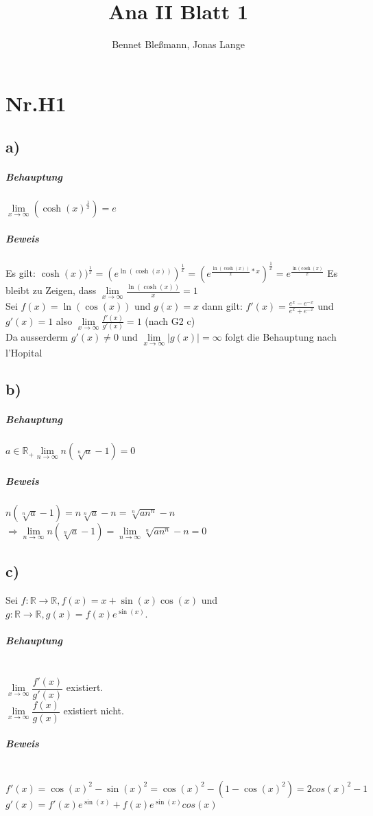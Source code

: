 \documentclass[12pt,a4paper,oneside,ngerman]{article} %
\title{Ana II Blatt 1}
\author{Bennet Bleßmann, Jonas Lange}
\begin{document}
\maketitle
\section*{Nr.H1}
\subsection*{a)}



\subparagraph*{Behauptung}

$\lim\limits_{x \to \infty}(\cosh(x)^{\frac{1}{x}}) = e$

\subparagraph*{Beweis}

Es gilt: $\cosh(x))^{\frac{1}{x}} = (e^{\ln(\cosh(x))})^{\frac{1}{x}}
= (e^{\frac {\ln(\cosh(x))}{x}*x})^{\frac{1}{x}} = e^{\frac{\ln(\cosh(x)}{x}}$
Es bleibt zu Zeigen, dass $\lim\limits_{x \to \infty}\frac{\ln(\cosh(x))}{x} = 1 $\\ 
Sei $f(x) = \ln(\cos(x))$ und $g(x)=x$ dann gilt: $f'(x) = \frac{e^{x}-e^{-x}}{e^{x}+e^{-x}} $ und $g'(x) = 1$ also  $\lim\limits_{   x \to \infty} \frac{f'(x)}{g'(x)} = 1 $ (nach G2 c) \\
Da ausserderm $g'(x)\neq 0$ und $ \lim\limits_{x\to\infty} |g(x)| = \infty $ folgt die Behauptung nach l'Hopital

\subsection*{b)}

\subparagraph*{Behauptung}

$a \in \mathbb{R}_{+} \lim\limits_{n \to \infty} n(\sqrt[n]{a}-1) = 0$

\subparagraph*{Beweis}

\indent $ n(\sqrt[n]{a}-1) = n\sqrt[n]{a} - n = \sqrt[n]{an^{n}} - n $ \\
\indent $ \Rightarrow \lim\limits_{n \to \infty} n(\sqrt[n]{a}-1) = \lim\limits_{n \to \infty} \sqrt[n]{an^{n}} - n = 0 $



\subsection*{c)}
Sei $ f:\mathbb{R} \to \mathbb{R},f(x) = x + \sin(x)\cos(x) $ und $ g:\mathbb{R} \to \mathbb{R},g(x) = f(x)e^{\sin(x)} $.

\subparagraph*{Behauptung} ~\\
\indent $\lim\limits_{x \to \infty} \dfrac{f'(x)}{g'(x)}$ existiert.\\
\indent $\lim\limits_{x \to \infty} \dfrac{f(x)}{g(x)}$ existiert nicht.

\subparagraph*{Beweis} ~\\
\indent $ f'(x) = \cos(x)^{2}-\sin(x)^{2} = \cos(x)^{2}-(1-\cos(x)^{2}) = 2 cos(x)^{2} - 1 $ \\
\indent $ g'(x) = f'(x)e^{\sin(x)}+f(x)e^{\sin(x)}cos(x)$ \\




	
\end{document}
